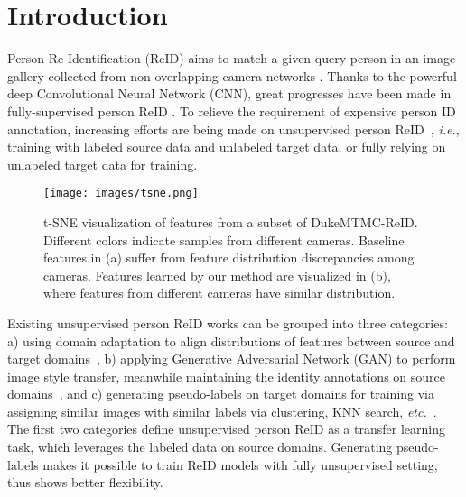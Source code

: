 \documentclass[final]{cvpr}
\begin{document}
\section{Introduction} \label{introduction}
Person Re-Identification (ReID) aims to match a given query person in an image gallery collected from non-overlapping camera networks \cite{market1501, dukemtmc}.
Thanks to the powerful deep Convolutional Neural Network (CNN), great progresses have been made in fully-supervised person ReID \cite{zhang2017alignedreid, PCB, LuoSB, liu2019self, demo}. To relieve the requirement of expensive person ID annotation, increasing efforts are being made on unsupervised person ReID~\cite{zhai2020multiple, zou2020joint, jin2020global, yu2019unsupervised, wu2019unsupervised, fu2019self}, \emph{i.e.}, training with labeled source data and unlabeled target data, or fully relying on unlabeled target data for training.

\begin{figure}[!t]
	\centering
	\texttt{[image: images/tsne.png]}
	\caption{t-SNE visualization \cite{t-SNE} of features from a subset of DukeMTMC-ReID. Different colors indicate samples from different cameras. Baseline features in (a) suffer from feature distribution discrepancies among cameras. Features learned by our method are visualized in (b), where features from different cameras have similar distribution.}
	\label{fig:1}
\end{figure}
Existing unsupervised person ReID works can be grouped into three categories: a) using domain adaptation to align distributions of features between source and target domains~\cite{wu2019unsupervised, lin2018multi, wang2018transferable}, b) applying Generative Adversarial Network (GAN) to perform image style transfer, meanwhile maintaining the identity annotations on source domains~\cite{zou2020joint, PTGan, zhong2018camera, deng2018image}, and c) generating pseudo-labels on target domains for training via assigning similar images with similar labels via clustering, KNN search, \emph{etc.}~\cite{lin2019bottom, fan2018unsupervised, zhai2020ad, fu2019self, multi-label}. The first two categories define unsupervised person ReID as a transfer learning task, which leverages the labeled data on source domains. Generating pseudo-labels makes it possible to train ReID models with fully unsupervised setting, thus shows better flexibility.
\end{document}
